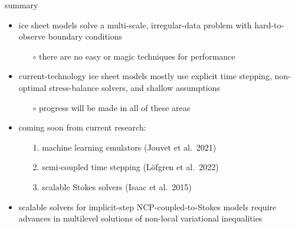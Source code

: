 \documentclass[svgnames,
               hyperref={colorlinks,citecolor=DeepPink4,linkcolor=FireBrick,urlcolor=Maroon},
               usepdftitle=false]  %
               {beamer}
\begin{document}
\begin{frame}{\alert{summary}}

\begin{itemize}
\item ice sheet models solve a multi-scale, irregular-data problem with hard-to-observe boundary conditions
   \begin{itemize}
   \item[$\circ$] there are \alert{no easy or magic techniques} for performance
   \end{itemize}
\item<2-> current-technology ice sheet models mostly use \alert{explicit} time stepping, \alert{non-optimal} stress-balance solvers, and \alert{shallow} assumptions
   \begin{itemize}
   \item[$\circ$] progress will be made in all of these areas
   \end{itemize}
\item<3-> \alert{coming soon} from current research:
   \begin{enumerate}
   \item[1.] machine learning emulators (Jouvet et al.~2021)
   \item[2.] semi-coupled time stepping (L{\"o}fgren et al.~2022)
   \item[3.] scalable Stokes solvers (Isaac et al.~2015)   
   \end{enumerate}
\item<4-> scalable solvers for implicit-step NCP-coupled-to-Stokes models require advances in \alert{multilevel solutions of non-local variational inequalities}
\end{itemize}
\end{frame}
\end{document}
